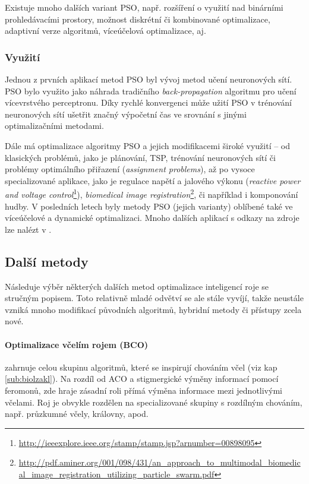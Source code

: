 \documentclass[a4paper,12pt]{article}
\begin{document}
\medskip

Existuje mnoho dalších variant PSO, např. rozšíření o využití nad binárními prohledávacími prostory, možnost
diskrétní či kombinované optimalizace, adaptivní verze algoritmů, víceúčelová optimalizace, aj.


\subsubsection{Využití}
Jednou z prvních aplikací metod PSO byl vývoj metod učení neuronových sítí. PSO bylo využito jako náhrada
tradičního {\it back-propagation} algoritmu pro učení vícevrstvého perceptronu. Díky rychlé konvergenci může
užití PSO v trénování neuronových sítí ušetřit značný výpočetní čas ve srovnání s jinými
optimalizačními metodami.

Dále má optimalizace algoritmy PSO a jejich modifikacemi široké využití -- od klasických problémů,
jako je plánování, TSP,
trénování neuronových sítí či problémy optimálního přiřazení ({\it assignment problems}), až po vysoce
specializované aplikace, jako je regulace napětí a jalového výkonu ({\it reactive power and voltage
control}\footnote{\url{http://ieeexplore.ieee.org/stamp/stamp.jsp?arnumber=00898095}}),
{\it biomedical image registration}\footnote{\url{http://pdf.aminer.org/001/098/431/an_approach_to_multimodal_biomedical_image_registration_utilizing_particle_swarm.pdf}},
či například i komponování hudby. V posledních letech byly metody PSO (jejich varianty) oblíbené také ve víceúčelové
a dynamické optimalizaci. Mnoho dalších aplikací s odkazy na zdroje lze nalézt v \cite{Blum08SwarmOpt}.

\subsection{Další metody}
Následuje výběr některých dalších metod optimalizace inteligencí roje se stručným popisem. Toto relativně mladé
odvětví se ale stále vyvíjí, takže neustále vzniká mnoho modifikací původních algoritmů, hybridní metody či
přístupy zcela nové.

\paragraph{Optimalizace včelím rojem (BCO)}zahrnuje celou skupinu algoritmů, které se inspirují
 chováním včel (viz kap \ref{sub:biolzakl}). Na rozdíl od ACO a stigmergické výměny informací pomocí feromonů,
 zde hraje zásadní roli přímá výměna informace mezi jednotlivými včelami. Roj je obvykle rozdělen na
 specializované skupiny s rozdílným chováním, např. průzkumné včely, královny, apod.
\end{document}
